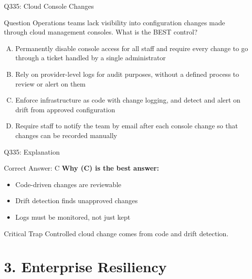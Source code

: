 \documentclass{beamer}
\begin{document}
	\begin{frame}{Q335: Cloud Console Changes}
		\begin{block}{Question}
			\small Operations teams lack visibility into configuration changes made through cloud management consoles. What is the BEST control?
		\end{block}
		\begin{enumerate}[(A)]
			\footnotesize
			\item Permanently disable console access for all staff and require every change to go through a ticket handled by a single administrator
			\item Rely on provider-level logs for audit purposes, without a defined process to review or alert on them
			\item Enforce infrastructure as code with change logging, and detect and alert on drift from approved configuration
			\item Require staff to notify the team by email after each console change so that changes can be recorded manually
		\end{enumerate}
	\end{frame}
	
	\begin{frame}{Q335: Explanation}
		\begin{block}{Correct Answer: C}
			\textbf{Why (C) is the best answer:}
			\begin{itemize}
				\item Code-driven changes are reviewable
				\item Drift detection finds unapproved changes
				\item Logs must be monitored, not just kept
			\end{itemize}
		\end{block}
		\begin{alertblock}{Critical Trap}
			Controlled cloud change comes from code and drift detection.
		\end{alertblock}
	\end{frame}
		
	\section{3. Enterprise Resiliency}
	
\end{document}
